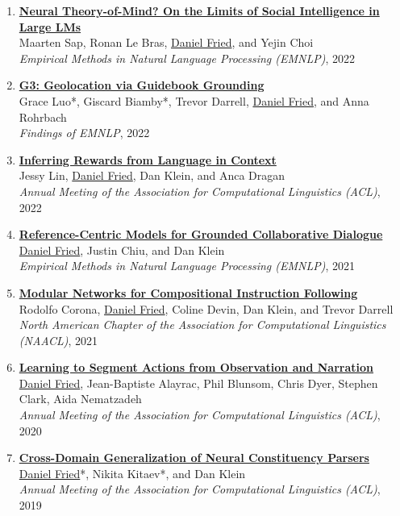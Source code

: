 \begin{enumerate}[leftmargin=-1mm,partopsep=0pt]
\item \href{https://arxiv.org/abs/2210.13312}{\textbf{Neural Theory-of-Mind? On the Limits of Social Intelligence in Large LMs}} \\
  Maarten Sap, Ronan Le Bras, \underline{Daniel Fried}, and Yejin Choi \\
  \emph{Empirical Methods in Natural Language Processing (EMNLP)}, 2022

\item \href{https://arxiv.org/abs/2211.15521}{\textbf{G3: Geolocation via Guidebook Grounding}} \\
  Grace Luo*, Giscard Biamby*, Trevor Darrell, \underline{Daniel Fried}, and Anna Rohrbach\\
  \emph{Findings of EMNLP}, 2022

\item \href{https://arxiv.org/abs/2204.02515}{\textbf{Inferring Rewards from Language in Context}} \\
  Jessy Lin, \underline{Daniel Fried}, Dan Klein, and Anca Dragan\\
  \emph{Annual Meeting of the Association for Computational Linguistics (ACL)}, 2022

\item \href{https://arxiv.org/abs/2109.05042}{\textbf{Reference-Centric Models for Grounded Collaborative Dialogue}} \\
  \underline{Daniel Fried}, Justin Chiu, and Dan Klein\\
  \emph{Empirical Methods in Natural Language Processing (EMNLP)}, 2021

\item \href{https://arxiv.org/abs/2010.12764}{\textbf{Modular Networks for Compositional Instruction Following}} \\
  Rodolfo Corona, \underline{Daniel Fried}, Coline Devin, Dan Klein, and Trevor Darrell\\
  \emph{North American Chapter of the Association for Computational Linguistics (NAACL)}, 2021

\item \href{https://arxiv.org/abs/2005.03684}{\textbf{Learning to Segment Actions from Observation and Narration}} \\
  \underline{Daniel Fried}, Jean-Baptiste Alayrac, Phil Blunsom, Chris Dyer, Stephen Clark, Aida Nematzadeh\\
  \emph{Annual Meeting of the Association for Computational Linguistics (ACL)}, 2020

\item \href{https://arxiv.org/abs/1907.04347}{\textbf{Cross-Domain Generalization of Neural Constituency Parsers}} \\
  \underline{Daniel Fried}*, Nikita Kitaev*, and Dan Klein\\
  \emph{Annual Meeting of the Association for Computational Linguistics (ACL)}, 2019


\end{enumerate}
